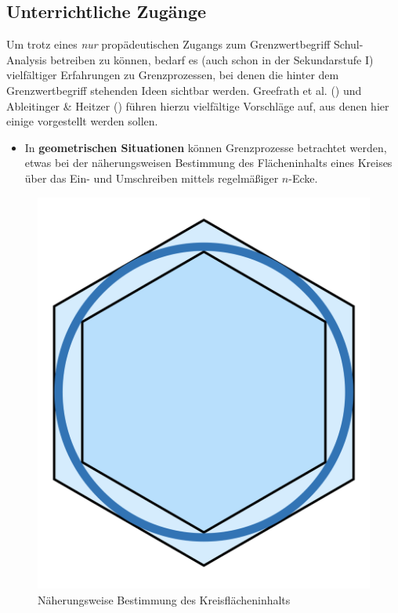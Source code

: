 \documentclass[
]{scrbook}
\providecommand{\tightlist}{%
  \setlength{\itemsep}{0pt}\setlength{\parskip}{0pt}}
\theoremstyle{definition}
\theoremstyle{definition}
\theoremstyle{definition}
\theoremstyle{definition}
\theoremstyle{remark}
\begin{document}
\subsection{Unterrichtliche Zugänge}\label{unterrichtliche-zuguxe4nge}

Um trotz eines \emph{nur} propädeutischen Zugangs zum Grenzwertbegriff Schul-Analysis betreiben zu können, bedarf es (auch schon in der Sekundarstufe I) vielfältiger Erfahrungen zu Grenzprozessen, bei denen die hinter dem Grenzwertbegriff stehenden Ideen sichtbar werden. Greefrath et al. () und Ableitinger \& Heitzer () führen hierzu vielfältige Vorschläge auf, aus denen hier einige vorgestellt werden sollen.

\begin{itemize}
\tightlist
\item
  In \textbf{geometrischen Situationen} können Grenzprozesse betrachtet werden, etwas bei der näherungsweisen Bestimmung des Flächeninhalts eines Kreises über das Ein- und Umschreiben mittels regelmäßiger \(n\)-Ecke.
\end{itemize}

\begin{figure}

{\centering \includegraphics[width=0.5\linewidth]{pictures/10-Kreis} 

}

\caption{Näherungsweise Bestimmung des Kreisflächeninhalts}\label{fig:Kreis}
\end{figure}
\end{document}

